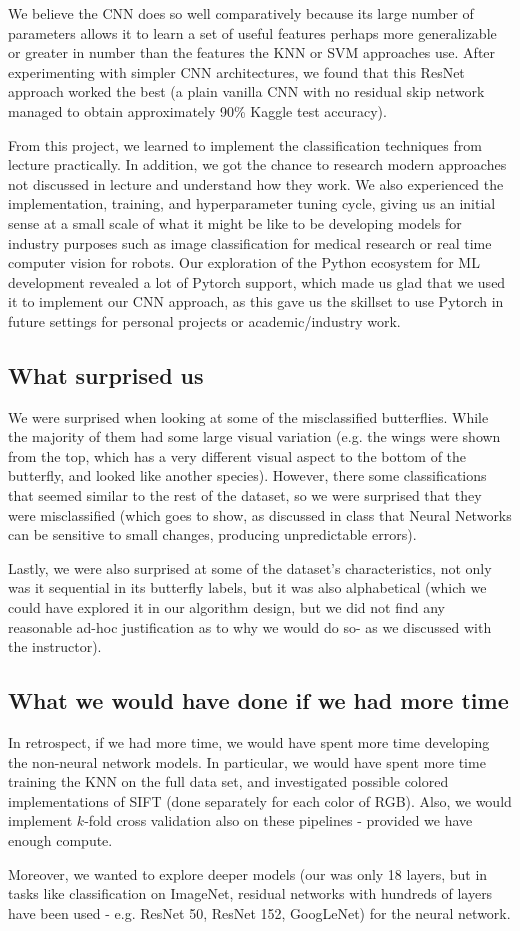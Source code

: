 \documentclass[10pt]{article} %
\begin{document}
We believe the CNN does so well comparatively because its large number of parameters allows it to learn a set of useful features perhaps more generalizable or greater in number than the features the KNN or SVM approaches use. After experimenting with simpler CNN architectures, we found that this ResNet approach worked the best (a plain vanilla CNN with no residual skip network managed to obtain approximately 90\% Kaggle test accuracy). 

From this project, we learned to implement the classification techniques from lecture practically. In addition, we got the chance to research modern approaches not discussed in lecture and understand how they work. We also experienced the implementation, training, and hyperparameter tuning cycle, giving us an initial sense at a small scale of what it might be like to be developing models for industry purposes such as image classification for medical research or real time computer vision for robots. Our exploration of the Python ecosystem for ML development revealed a lot of Pytorch support, which made us glad that we used it to implement our CNN approach, as this gave us the skillset to use Pytorch in future settings for personal projects or academic/industry work.

\subsection{What surprised us}
We were surprised when looking at some of the misclassified butterflies. While the majority of them had some large visual variation (e.g. the wings were shown from the top, which has a very different visual aspect to the bottom of the butterfly, and looked like another species). However, there some classifications that seemed similar to the rest of the dataset, so we were surprised that they were misclassified (which goes to show, as discussed in class that Neural Networks can be sensitive to small changes, producing unpredictable errors). \par
Lastly, we were also surprised at some of the dataset's characteristics, not only was it sequential in its butterfly labels, but it was also alphabetical (which we could have explored it in our algorithm design, but we did not find any reasonable ad-hoc justification as to why we would do so- as we discussed with the instructor).
\subsection{What we would have done if we had more time}
In retrospect, if we had more time, we would have spent more time developing the non-neural network models. In particular, we would have spent more time training the KNN on the full data set, and investigated possible colored implementations of SIFT (done separately for each color of RGB). Also, we would implement $k$-fold cross validation also on these pipelines - provided we have enough compute.\par
Moreover, we wanted to explore deeper models (our was only 18 layers, but in tasks like classification on ImageNet, residual networks with hundreds of layers have been used - e.g. ResNet 50, ResNet 152, GoogLeNet) for the neural network. \par
\end{document}
